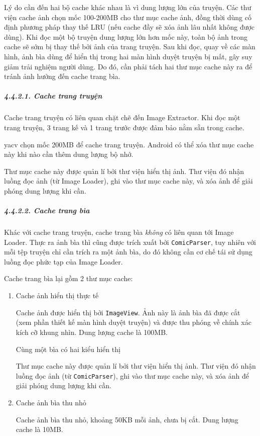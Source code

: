 \documentclass[
]{article}
\begin{document}
Lý do cần đến hai bộ cache khác nhau là vì dung lượng lớn của truyện.
Các thư viện cache ảnh chọn mốc 100-200MB cho thư mục cache ảnh, đồng
thời dùng cố định phương pháp thay thế LRU (nếu cache đầy sẽ xóa ảnh lâu
nhất không được dùng). Khi đọc một bộ truyện dung lượng lớn hơn mốc này,
toàn bộ ảnh trong cache sẽ sớm bị thay thế bởi ảnh của trang truyện. Sau
khi đọc, quay về các màn hình, ảnh bìa dùng để hiển thị trong hai màn
hình duyệt truyện bị mất, gây suy giảm trải nghiệm người dùng. Do đó,
cần phải tách hai thư mục cache này ra để tránh ảnh hưởng đến cache
trang bìa.

\hypertarget{cache-trang-truyux1ec7n}{%
\subparagraph{4.4.2.1. Cache trang
truyện}\label{cache-trang-truyux1ec7n}}

Cache trang truyện có liên quan chặt chẽ đến Image Extractor. Khi đọc
một trang truyện, 3 trang kế và 1 trang trước được đảm bảo nằm sẵn trong
cache.

yacv chọn mốc 200MB để cache trang truyện. Android có thể xóa thư mục
cache này khi nào cần thêm dung lượng bộ nhớ.

Thư mục cache này được quản lí bởi thư viện hiển thị ảnh. Thư viện đó
nhận luồng đọc ảnh (từ Image Loader), ghi vào thư mục cache này, và xóa
ảnh để giải phóng dung lượng khi cần.

\hypertarget{cache-trang-buxeca}{%
\subparagraph{4.4.2.2. Cache trang bìa}\label{cache-trang-buxeca}}

Khác với cache trang truyện, cache trang bìa \emph{không} có liên quan
tới Image Loader. Thực ra ảnh bìa thì cũng được trích xuất bởi
\texttt{ComicParser}, tuy nhiên với mỗi tệp truyện chỉ cần trích ra một
ảnh bìa, do đó không cần cơ chế tái sử dụng luồng đọc phức tạp của Image
Loader.

Cache trang bìa lại gồm 2 thư mục cache:

\begin{enumerate}
\def\labelenumi{\arabic{enumi}.}
\item
  Cache ảnh hiển thị thực tế

  Cache ảnh được hiển thị bởi \texttt{ImageView}. Ảnh này là ảnh bìa đã
  được cắt (xem phần thiết kế màn hình duyệt truyện) và được thu phóng
  về chính xác kích cỡ khung nhìn. Dung lượng cache là 100MB.

  Cùng một bìa có hai kiểu hiển thị

  Thư mục cache này được quản lí bởi thư viện hiển thị ảnh. Thư viện đó
  nhận luồng đọc ảnh (từ \texttt{ComicParser}), ghi vào thư mục cache
  này, và xóa ảnh để giải phóng dung lượng khi cần.
\item
  Cache ảnh bìa thu nhỏ

  Cache ảnh bìa thu nhỏ, khoảng 50KB mỗi ảnh, chưa bị cắt. Dung lượng
  cache là 10MB.
\end{enumerate}
\end{document}

